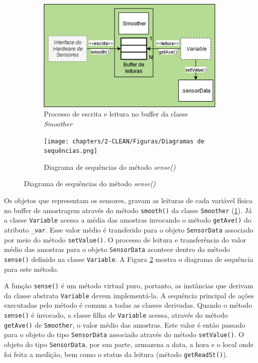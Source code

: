 \begin{figure}[t]
    \centering
    \caption{Processo de leitura de uma variável}
    \begin{subfigure}{0.495\textwidth}
        \includegraphics[width=\textwidth]{chapters/2-CLEAN/Figuras/Diagrama R_W Buffer Smoother.png}
        \caption{Processo de escrita e leitura no buffer da classe \textit{Smoother}}
        \label{fig:fw-read-write-smoother}
    \end{subfigure}
    \hfill
    \begin{subfigure}{0.495\textwidth}
        \texttt{[image: chapters/2-CLEAN/Figuras/Diagramas de sequências.png]}
        \caption{Diagrama de sequências do método \textit{sense()}}
        \label{fig:fw-sense-seq}
    \end{subfigure}
    \hfill
    \label{fig:fw-read-variable}
\end{figure}

Os objetos que representam os sensores, gravam as leituras de cada variável física no buffer de amostragem através do método \texttt{smooth()} da classe \texttt{Smoother} (\ref{fig:fw-read-write-smoother}). Já a classe \texttt{Variable} acessa a média das amostras invocando o método \texttt{getAve()} do atributo \texttt{\_var}. Esse valor médio é transferido para o objeto \texttt{SensorData} associado por meio do método \texttt{setValue()}. O processo de leitura e transferência do valor médio das amostras para o objeto \texttt{SensorData} acontece dentro do método \texttt{sense()} definido na classe \texttt{Variable}. A Figura \ref{fig:fw-sense-seq} mostra o diagrama de sequência para este método.

A função \texttt{sense()} é um método virtual puro, portanto, as instâncias que derivam da classe abstrata \texttt{Variable} devem implementá-la. A sequência principal de ações executadas pelo método é comum a todas as classes derivadas. Quando o método \texttt{sense()} é invocado, a classe filha de \texttt{Variable} acessa, através do método \texttt{getAve()} de \texttt{Smoother}, o valor médio das amostras. Este valor é então passado para o objeto do tipo \texttt{SensorData} associado através do método \texttt{setValue()}. O objeto do tipo \texttt{SensorData}, por sua parte, armazena a data, a hora e o local onde foi feita a medição, bem como o status da leitura (método \texttt{getReadSt()}).

